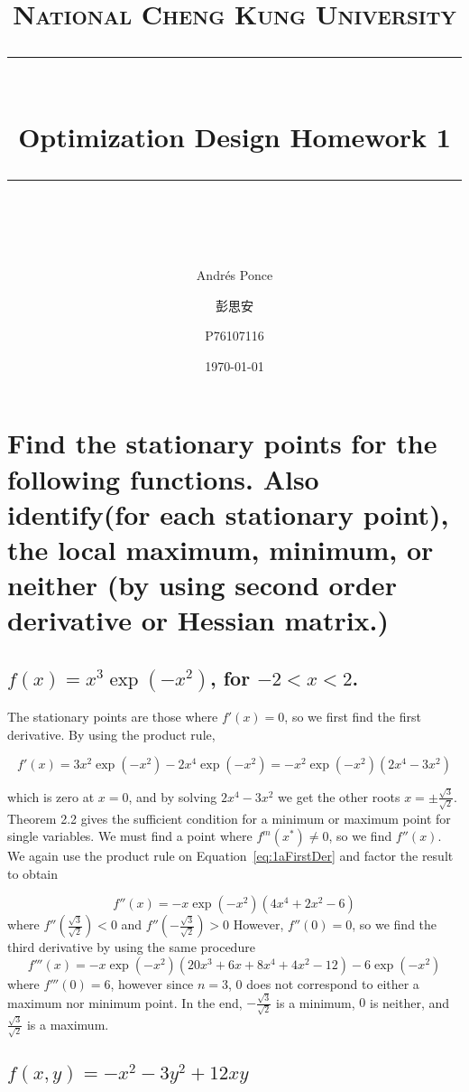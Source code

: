 \documentclass[11pt]{scrartcl}
\title{ 
	\normalfont\normalsize
	\textsc{National Cheng Kung University}\\
	\vspace{25pt}
	\rule{\linewidth}{0.5pt}\\
	\vspace{20pt}
	{\huge Optimization Design Homework 1}\\
	\vspace{12pt}
	\rule{\linewidth}{2pt}\\
	\vspace{12pt}
}
\author{\Large Andr\'es Ponce \and 彭思安 \and P76107116}
\date{\normalsize\today}
\begin{document}
\maketitle
\section{Find the stationary points for the following functions. 
Also identify(for each stationary point), the local maximum, minimum,
or neither (by using second order derivative or Hessian matrix.)}

\subsection{$f(x) = x^{3}\exp(-x^2)$, for $-2<x<2$.}
The stationary points are those where $f'(x) = 0$, so we first find
the first derivative.
By using the product rule,

\begin{equation}
\label{eq:1aFirstDer}
f'(x) = 3x^{2}\exp(-x^{2}) -2x^{4}\exp(-x^{2}) = -x^2 \exp(-x^{2})(2x^4 - 3x^2)
\end{equation}

which is zero at $x=0$, and by solving $2x^4 - 3x^2$ we get the other roots $x=\pm\frac{\sqrt{3}}{\sqrt{2}}$.
Theorem 2.2 gives the sufficient condition for a minimum or maximum point for
single variables.
We must find a point where $f^{m}(x^{*}) \neq 0$, so we find $f''(x)$.
We again use the product rule on Equation~\ref{eq:1aFirstDer} and factor 
the result to obtain

\begin{equation}
	\label{eq:1aSecondDer}
	f''(x) = -x\exp(-x^{2})(4x^4 + 2x^2 -6)
\end{equation}
where $f''(\frac{\sqrt{3}}{\sqrt{2}}) < 0$ and $f''(-\frac{\sqrt{3}}{\sqrt{2}}) > 0$ However, $f''(0) = 0$,
so we find the third derivative by using the same procedure
\begin{equation}
\label{eq:1aThirdDer}
f'''(x) = -x\exp(-x^{2})(20x^3 + 6x + 8x^4 + 4x^2 -12) - 6\exp(-x^2)
\end{equation}
where $f'''(0)=6$, however since $n=3$, $0$ does not correspond to either
a maximum nor minimum point.
In the end, $-\frac{\sqrt{3}}{\sqrt{2}}$ is a minimum, $0$ is neither, and 
$\frac{\sqrt{3}}{\sqrt{2}}$ is a maximum.

\subsection{$f(x, y) = -x^2 -3y^2 + 12xy$}
\end{document}
